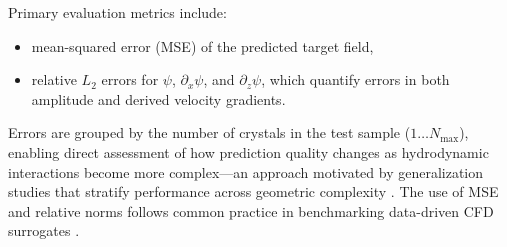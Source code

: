 Primary evaluation metrics include:
\begin{itemize}
    \item mean-squared error (MSE) of the predicted target field,
    \item relative $L_2$ errors for $\psi$, $\partial_x\psi$, and $\partial_z\psi$,
          which quantify errors in both amplitude and derived velocity gradients.
\end{itemize}

Errors are grouped by the number of crystals in the test sample ($1\ldots N_{\max}$), enabling direct assessment of how prediction quality changes as hydrodynamic interactions become more complex—an approach motivated
by generalization studies that stratify performance across geometric complexity \parencite{morimoto_generalization_2022}. The use of MSE and relative norms follows common practice in benchmarking data-driven CFD surrogates
\parencite{takamoto_pdebench_nodate,lu_comprehensive_2022}. 
